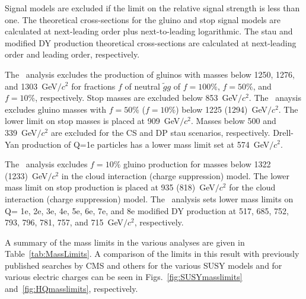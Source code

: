 Signal models are excluded if the limit on the relative signal strength is less than one.
The theoretical cross-sections for the gluino and stop signal models are calculated at next-leading order plus next-to-leading logarithmic.
The stau and modified DY production theoretical cross-sections are calculated at next-leading order and leading order, respectively.

The \muononly\ analysis excludes the production of gluinos with masses below 1250, 1276, and 1303~GeV$/c^2$ for fractions $f$ of neutral $\tilde{g}g$ of
$f=100\%$, $f=50\%$, and $f=10\%$, respectively. Stop masses are excluded below 853~GeV$/c^2$. The \tktof\ anaysis excludes gluino masses with
$f=50\%$ ($f=10\%$) below 1225 (1294)~GeV$/c^2$. The lower limit on stop masses is placed at 909~GeV$/c^2$. Masses below 500 and 339~GeV$/c^2$ are excluded for the CS 
and DP stau scenarios, respectively. Drell-Yan production of Q=1e particles has a lower mass limit set at 574~GeV$/c^2$. 

The \tkonly\ analysis excludes $f=10\%$ gluino production for masses below 1322 (1233)~GeV$/c^2$ in the cloud interaction (charge suppression) model. 
The lower mass limit on stop production is placed at 935 (818)~GeV$/c^2$ for the cloud interaction (charge suppression) model.
The \multi\ analysis sets lower mass limits on Q= 1e, 2e, 3e, 4e, 5e, 6e, 7e, and 8e modified DY production at 517, 685, 752, 793, 796, 781, 757, and 715~GeV$/c^2$, respectively.

A summary of the mass limits in the various analyses are given in Table~\ref{tab:MassLimits}.
A comparison of the limits in this result with previously published searches by CMS and others for the various SUSY models and for 
various electric charges can be seen in Figs.~\ref{fig:SUSYmasslimits}
and~\ref{fig:HQmasslimits}, respectively.


